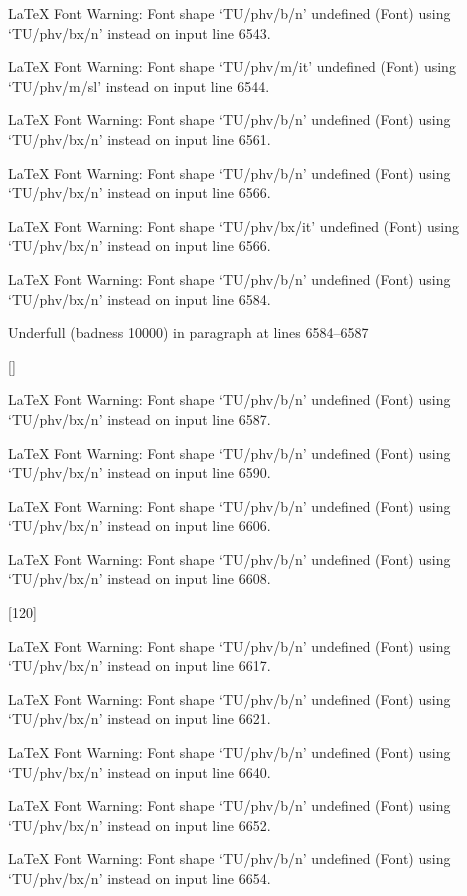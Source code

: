 LaTeX Font Warning: Font shape `TU/phv/b/n' undefined
(Font)              using `TU/phv/bx/n' instead on input line 6543.


LaTeX Font Warning: Font shape `TU/phv/m/it' undefined
(Font)              using `TU/phv/m/sl' instead on input line 6544.


LaTeX Font Warning: Font shape `TU/phv/b/n' undefined
(Font)              using `TU/phv/bx/n' instead on input line 6561.


LaTeX Font Warning: Font shape `TU/phv/b/n' undefined
(Font)              using `TU/phv/bx/n' instead on input line 6566.


LaTeX Font Warning: Font shape `TU/phv/bx/it' undefined
(Font)              using `TU/phv/bx/n' instead on input line 6566.


LaTeX Font Warning: Font shape `TU/phv/b/n' undefined
(Font)              using `TU/phv/bx/n' instead on input line 6584.


Underfull \hbox (badness 10000) in paragraph at lines 6584--6587

 []


LaTeX Font Warning: Font shape `TU/phv/b/n' undefined
(Font)              using `TU/phv/bx/n' instead on input line 6587.


LaTeX Font Warning: Font shape `TU/phv/b/n' undefined
(Font)              using `TU/phv/bx/n' instead on input line 6590.


LaTeX Font Warning: Font shape `TU/phv/b/n' undefined
(Font)              using `TU/phv/bx/n' instead on input line 6606.


LaTeX Font Warning: Font shape `TU/phv/b/n' undefined
(Font)              using `TU/phv/bx/n' instead on input line 6608.

[120]

LaTeX Font Warning: Font shape `TU/phv/b/n' undefined
(Font)              using `TU/phv/bx/n' instead on input line 6617.


LaTeX Font Warning: Font shape `TU/phv/b/n' undefined
(Font)              using `TU/phv/bx/n' instead on input line 6621.


LaTeX Font Warning: Font shape `TU/phv/b/n' undefined
(Font)              using `TU/phv/bx/n' instead on input line 6640.


LaTeX Font Warning: Font shape `TU/phv/b/n' undefined
(Font)              using `TU/phv/bx/n' instead on input line 6652.


LaTeX Font Warning: Font shape `TU/phv/b/n' undefined
(Font)              using `TU/phv/bx/n' instead on input line 6654.


